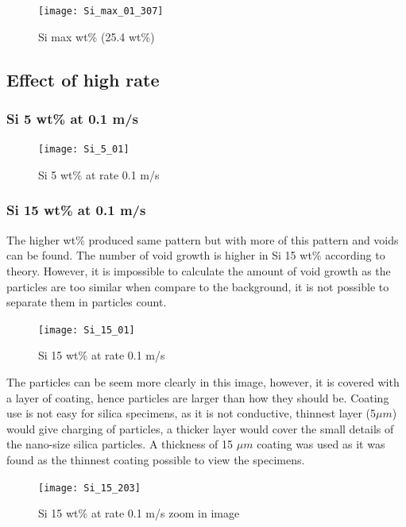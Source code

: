 \documentclass[numbers=noendperiod,chapterprefix=on]{icldt} %
\begin{document}
{\begin{figure}[!hp]
\centering
\texttt{[image: Si\_max\_01\_307]}
\caption{Si max wt\% (25.4 wt\%) 
} 
\label{Si_max_0.1_307}
\end{figure}
\FloatBarrier

\subsection{Effect of high rate}

\subsubsection{Si 5 wt\% at 0.1 m/s}

\begin{figure}[!hp]
\centering
\texttt{[image: Si\_5\_01]}
\caption{Si 5 wt\% at rate 0.1 m/s} \label{Si_5_01}
\end{figure}
\FloatBarrier

\subsubsection{Si 15 wt\% at 0.1 m/s}

The higher wt\% produced same pattern but with more of this pattern and voids can be found. The number of void growth is higher in Si 15 wt\% according to theory.  However, it is impossible to calculate the amount of void growth as the particles are too similar when compare to the background, it is not possible to separate them in particles count.

\begin{figure}[!hp]
\centering
\texttt{[image: Si\_15\_01]}
\caption{Si 15 wt\% at rate 0.1 m/s} \label{Si_15_01}
\end{figure}
\FloatBarrier

The particles can be seem more clearly in this image, however, it is covered with a layer of coating, hence particles are larger than how they should be. Coating use is not easy for silica specimens, as it is not conductive, thinnest layer (5$ \mu m$) would give charging of particles, a thicker layer would cover the small details of the nano-size silica particles. A thickness of 15 $ \mu  m$ coating was used as it was found as the thinnest coating possible to view the specimens.

\begin{figure}[!hp]
\centering
\texttt{[image: Si\_15\_203]}
\caption{Si 15 wt\% at rate 0.1 m/s zoom in image} \label{Si_15_203}
\end{figure}
\FloatBarrier

}
\end{document}
